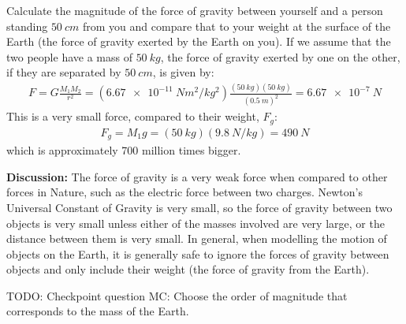 \begin{example}{Calculate the magnitude of the force of gravity between yourself and a person standing $\SI{50}{cm}$ from you and compare that to your weight at the surface of the Earth (the force of gravity exerted by the Earth on you).}
If we assume that the two people have a mass of $\SI{50}{kg}$, the force of gravity exerted by one on the other, if they are separated by $\SI{50}{cm}$, is given by:
\begin{align*}
F=G\frac{M_1M_2}{r^2}=(\SI{6.67e-11}{Nm^2/kg^2})\frac{(\SI{50}{kg})(\SI{50}{kg})}{(\SI{0.5}{m})^2}=\SI{6.67e-7}{N}
\end{align*}
This is a very small force, compared to their weight, $F_g$:
\begin{align*}
F_g=M_1g=(\SI{50}{kg})(\SI{9.8}{N/kg})=\SI{490}{N}
\end{align*}
which is approximately 700 million times bigger. 

\textbf{Discussion:} The force of gravity is a very weak force when compared to other forces in Nature, such as the electric force between two charges. Newton's Universal Constant of Gravity is very small, so the force of gravity between two objects is very small unless either of the masses involved are very large, or the distance between them is very small. In general, when modelling the motion of objects on the Earth, it is generally safe to ignore the forces of gravity between objects and only include their weight (the force of gravity from the Earth). 
\end{example}

TODO: Checkpoint question MC: Choose the order of magnitude that corresponds to the mass of the Earth.

